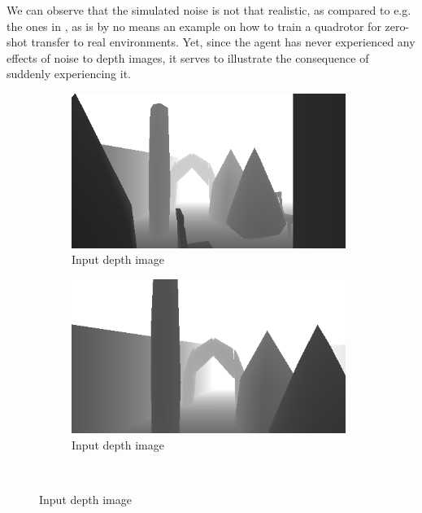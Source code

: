 We can observe that the simulated noise is not that realistic, as compared to e.g. the ones in \cite{HighSpeedFlightWild}, as is by no means an example on how to train a quadrotor for zero-shot transfer to real environments. Yet, since the agent has never experienced any effects of noise to depth images, it serves to illustrate the consequence of suddenly experiencing it.
\begin{figure}[H]
    \centering
    \begin{subfigure}[b]{0.49\textwidth}
        \centering
        \captionsetup{justification=centering}
        \includegraphics[width=0.98\textwidth]{figures/7_2/11_0_a_pre_image.png}
        \caption{Input depth image}
        \label{fig:11_0_a_pre_image}
    \end{subfigure} 
    \hfill
    \begin{subfigure}[b]{0.49\textwidth}
        \centering
        \captionsetup{justification=centering}
        \includegraphics[width=0.98\textwidth]{figures/7_2/60_0_a_pre_image.png}
        \caption{Input depth image}
        \label{fig:60_0_a_pre_image}
    \end{subfigure}
    \\

\end{figure}

